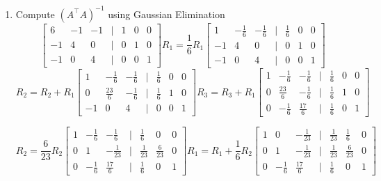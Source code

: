 \documentclass[11pt]{article}
\begin{document}
\begin{enumerate}
\begin{enumerate}
\item Compute \((A^\top A)^{-1}\) using Gaussian Elimination
\[
    \begin{bmatrix}
        6 & -1 & -1 &|& 1 & 0 & 0 \\
        -1 & 4 & 0 &|& 0 & 1 & 0 \\
        -1 & 0 & 4 &|& 0 & 0 & 1
    \end{bmatrix}
    R_1 = \frac{1}{6}R_1
    \begin{bmatrix}
        1 & -\frac{1}{6} & -\frac{1}{6} &|& \frac{1}{6} & 0 & 0 \\
        -1 & 4 & 0 &|& 0 & 1 & 0 \\
        -1 & 0 & 4 &|& 0 & 0 & 1
    \end{bmatrix}
\]
\[
    R_2 = R_2 + R_1
    \begin{bmatrix}
        1 & -\frac{1}{6} & -\frac{1}{6} &|& \frac{1}{6} & 0 & 0 \\
        0 & \frac{23}{6} & -\frac{1}{6} &|& \frac{1}{6} & 1 & 0 \\
        -1 & 0 & 4 &|& 0 & 0 & 1
    \end{bmatrix}
    R_3 = R_3 + R_1
    \begin{bmatrix}
        1 & -\frac{1}{6} & -\frac{1}{6} &|& \frac{1}{6} & 0 & 0 \\
        0 & \frac{23}{6} & -\frac{1}{6} &|& \frac{1}{6} & 1 & 0 \\
        0 & -\frac{1}{6} & \frac{17}{6} &|& \frac{1}{6} & 0 & 1
    \end{bmatrix}
\]

\[
    R_2 = \frac{6}{23}R_2
    \begin{bmatrix}
        1 & -\frac{1}{6} & -\frac{1}{6} &|& \frac{1}{6} & 0 & 0 \\
        0 & 1 & -\frac{1}{23} &|& \frac{1}{23} & \frac{6}{23} & 0 \\
        0 & -\frac{1}{6} & \frac{17}{6} &|& \frac{1}{6} & 0 & 1
    \end{bmatrix}
    R_1 = R_1 + \frac{1}{6}R_2
    \begin{bmatrix}
        1 & 0 & -\frac{1}{23} &|& \frac{1}{23} & \frac{1}{6} & 0 \\
        0 & 1 & -\frac{1}{23} &|& \frac{1}{23} & \frac{6}{23} & 0 \\
        0 & -\frac{1}{6} & \frac{17}{6} &|& \frac{1}{6} & 0 & 1
    \end{bmatrix}
\]


\end{enumerate}
\end{enumerate}
\end{document}

